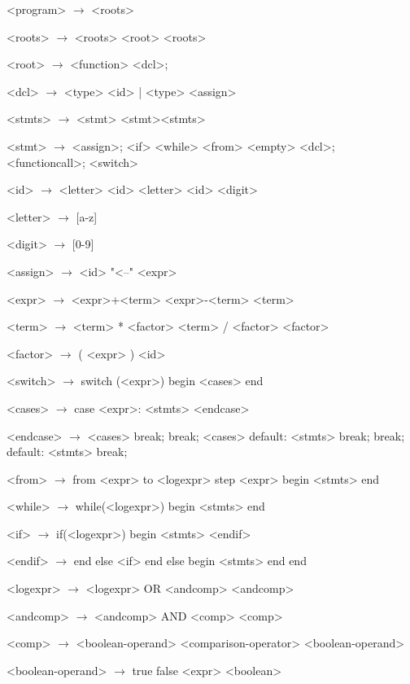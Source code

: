 \documentclass{article}
\begin{document}
\begin{grammar}
<program> $\rightarrow$ <roots>

<roots> $\rightarrow$ <roots>
\alt <root> <roots>

<root> $\rightarrow$ <function>
\alt <dcl>;

<dcl> $\rightarrow$ <type> <id>
| <type> <assign>

<stmts> $\rightarrow$ <stmt>
	\alt <stmt><stmts>

<stmt> $\rightarrow$ <assign>;
	\alt <if>
	\alt <while>
	\alt <from>
	\alt <empty>
	\alt <dcl>;
	\alt <functioncall>;
	\alt <switch>

<id> $\rightarrow$ <letter>
	\alt<id> <letter>
	\alt<id> <digit>

<letter> $\rightarrow$ [a-z]
	\alt [A-Z]

<digit> $\rightarrow$ [0-9]

<assign>  $\rightarrow$ <id> "<--" <expr>

<expr> $\rightarrow$ <expr>+<term>
	\alt<expr>-<term>
	\alt<term>

<term> $\rightarrow$ <term> * <factor>
	\alt <term> / <factor>
	\alt <factor>

<factor> $\rightarrow$ ( <expr> )
	\alt <id>

<switch> $\rightarrow$ switch (<expr>)
		begin
			<cases>
		end

<cases> $\rightarrow$ case <expr>:
			<stmts>
		<endcase>
		
<endcase> $\rightarrow$ <cases>
		\alt break;
		\alt break;
		<cases>
		\alt default:
			<stmts>
			break;
		\alt break;
		default:
			<stmts>
			break;

<from> $\rightarrow$ from <expr> to <logexpr> step <expr>
	begin
		<stmts>
	end 

<while> $\rightarrow$ while(<logexpr>)
		begin
			<stmts>
		end

<if> $\rightarrow$ if(<logexpr>)
	begin
		<stmts>
	<endif>

<endif> $\rightarrow$ end
	else <if>
	\alt end
	else
	begin
		<stmts>
	end
	\alt end

<logexpr> $\rightarrow$ <logexpr> OR <andcomp>
		\alt <andcomp>

<andcomp> $\rightarrow$ <andcomp> AND <comp>

<comp> $\rightarrow$ <boolean-operand> <comparison-operator> <boolean-operand>

<boolean-operand> $\rightarrow$ true
		\alt false
		\alt <boolean>


\end{grammar}
\end{document}
